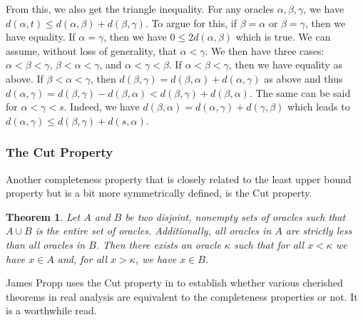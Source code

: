 \documentclass[12pt]{article}
\newtheorem{theorem}{Theorem}[subsection]
\begin{document}
From this, we also get the triangle inequality. For any oracles $\alpha, \beta, \gamma$, we have $d(\alpha,t) \leq d(\alpha,\beta) + d(\beta, \gamma)$.  To argue for this, if $\beta = \alpha$ or $\beta=\gamma$, then we have equality. If $\alpha=\gamma$, then we have $0 \leq 2 d(\alpha,\beta)$ which is true. We can assume, without loss of generality, that $\alpha < \gamma$. We then have three cases: $\alpha< \beta< \gamma$, $\beta < \alpha < \gamma$, and $\alpha< \gamma  < \beta$. If $\alpha < \beta< \gamma$, then we have equality as above. If $\beta < \alpha < \gamma$, then $d(\beta, \gamma) = d(\beta,\alpha) + d(\alpha,\gamma)$ as above and thus $d(\alpha,\gamma) = d(\beta, \gamma) - d(\beta,\alpha) < d(\beta, \gamma) + d(\beta,\alpha)$. The same can be said for $\alpha < \gamma < s$. Indeed,  we have $d(\beta,\alpha) = d(\alpha,\gamma) + d(\gamma,\beta)$ which leads to $d(\alpha,\gamma) \leq d(\beta, \gamma) + d(s,\alpha)$.

\subsubsection{The Cut Property}

Another completeness property that is closely related to the least upper bound property but is a bit more symmetrically defined, is the Cut property. 

\begin{theorem}\label{th:cut}
    Let $A$ and $B$ be two disjoint, nonempty sets of oracles such that $A \cup B$ is the entire set of oracles.  Additionally, all oracles in $A$ are strictly less than all oracles in $B$. Then there exists an oracle $\kappa$ such that for all $x < \kappa$ we have $x \in A$ and, for all $x > \kappa$, we have $x \in B$.
\end{theorem}

James Propp uses the Cut property in \cite{propp} to establish whether various cherished theorems in real analysis are equivalent to the completeness properties or not. It is a worthwhile read. 
\end{document}
